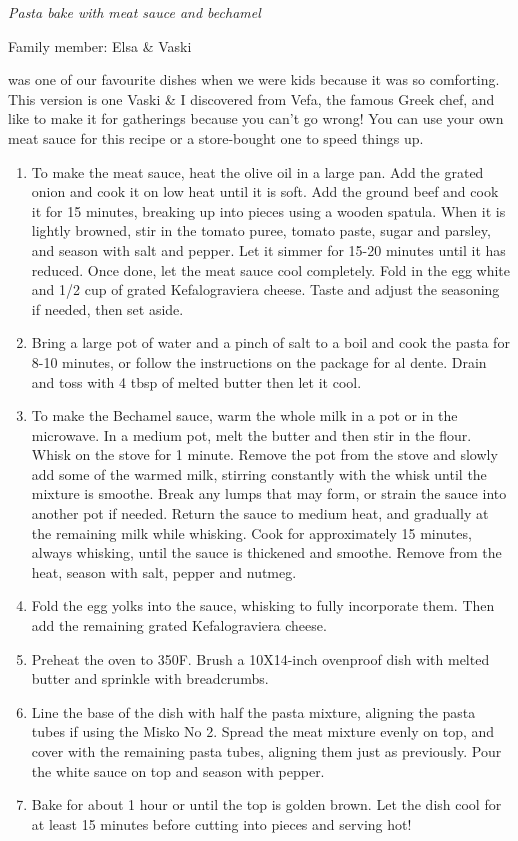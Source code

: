 \textit{Pasta bake with meat sauce and bechamel}

Family member: Elsa \& Vaski

 was one of our favourite dishes when we were kids because it was so comforting. This version is one Vaski \& I discovered from Vefa, the famous Greek chef, and like to make it for gatherings because you can't go wrong! You can use your own meat sauce for this recipe or a store-bought one to speed things up.

\begin{enumerate}
    \item To make the meat sauce, heat the olive oil in a large pan. Add the grated onion and cook it on low heat until it is soft. Add the ground beef and cook it for 15 minutes, breaking up into pieces using a wooden spatula. When it is lightly browned, stir in the tomato puree, tomato paste, sugar and parsley, and season with salt and pepper. Let it simmer for 15-20 minutes until it has reduced. Once done, let the meat sauce cool completely. Fold in the egg white and 1/2 cup of grated Kefalograviera cheese. Taste and adjust the seasoning if needed, then set aside.
    \item Bring a large pot of water and a pinch of salt to a boil and cook the pasta for 8-10 minutes, or follow the instructions on the package for al dente. Drain and toss with 4 tbsp of melted butter then let it cool.
    \item To make the Bechamel sauce, warm the whole milk in a pot or in the microwave. In a medium pot, melt the butter and then stir in the flour. Whisk on the stove for 1 minute. Remove the pot from the stove and slowly add some of the warmed milk, stirring constantly with the whisk until the mixture is smoothe. Break any lumps that may form, or strain the sauce into another pot if needed. Return the sauce to medium heat, and gradually at the remaining milk while whisking. Cook for approximately 15 minutes, always whisking, until the sauce is thickened and smoothe. Remove from the heat, season with salt, pepper and nutmeg.
    \item Fold the egg yolks into the sauce, whisking to fully incorporate them. Then add the remaining grated Kefalograviera cheese.
    \item Preheat the oven to 350\degree F. Brush a 10X14-inch ovenproof dish with melted butter and sprinkle with breadcrumbs.
    \item Line the base of the dish with half the pasta mixture, aligning the pasta tubes if using the Misko No 2. Spread the meat mixture evenly on top, and cover with the remaining pasta tubes, aligning them just as previously. Pour the white sauce on top and season with pepper.
    \item Bake for about 1 hour or until the top is golden brown. Let the dish cool for at least 15 minutes before cutting into pieces and serving hot!
\end{enumerate}
